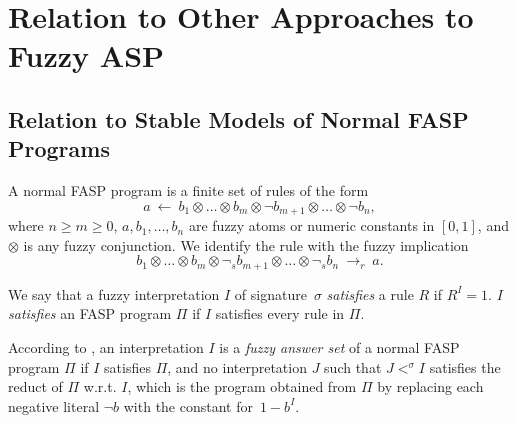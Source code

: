 \documentclass[runningheads]{llncs}
\def\ar{\leftarrow}
\def\ar{\leftarrow}
\def\rar{\rightarrow}
\def\fand{\otimes}
\begin{document}
\vspace{-0.3cm}


\section{Relation to Other Approaches to  Fuzzy  ASP} \label{sec:rel-fuzzyasp}  

\subsection{Relation to Stable Models of Normal FASP Programs} \label{ssec:normal-fasp}

A normal FASP program is a finite set of
rules of the form
\[ 
  a\ \ar\ b_1 \fand \dots \fand b_m \fand \neg b_{m+1}
\fand \dots \fand \neg b_n, 
\] 
where $n\geq m \geq 0$, $a, b_1, \dots, b_n$ are fuzzy atoms or
numeric constants in $[0,1]$, and $\fand$ is any fuzzy conjunction. We identify the rule with the fuzzy implication 
\[ 
   b_1\fand\dots\fand b_m\fand\neg_{\!s} b_{m+1}\fand\dots\fand
   \neg_{\!s} b_n\ \rar_r\ a. 
\] 

We say that a fuzzy interpretation $I$ of signature~$\sigma$ {\em
  satisfies} a rule $R$ if $R^I=1$. $I$ {\em satisfies} an FASP
program $\Pi$ if $I$ satisfies every rule in $\Pi$. 

%
According to \cite{lukasiewicz06fuzzy}, an interpretation $I$ is a
{\em fuzzy answer set} of a normal FASP program $\Pi$ if $I$ satisfies $\Pi$, and no interpretation $J$ such that $J<^\sigma I$ satisfies the reduct of
$\Pi$ w.r.t. $I$, which is the program obtained from $\Pi$ by replacing each
negative literal $\neg b$ with the constant for~$1-b^I$. 


\end{document}
